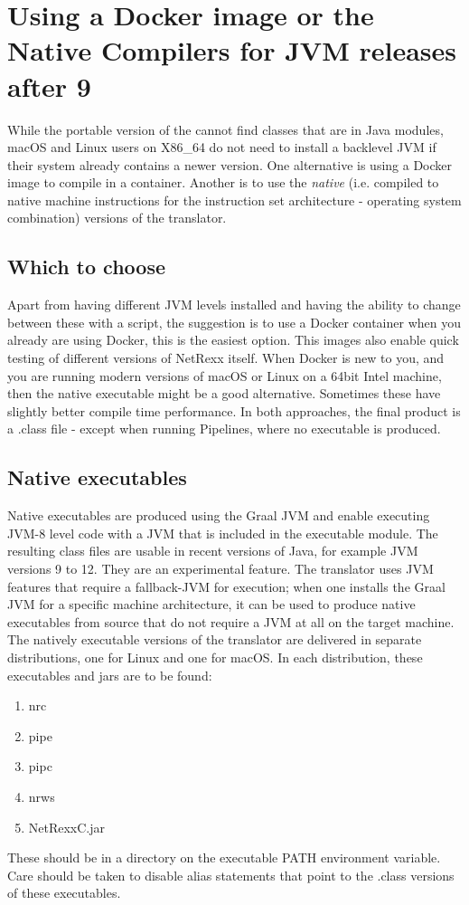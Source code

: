 \chapter{Using a Docker image or the Native Compilers for JVM releases after 9}\label{native compiler}
While the portable version of the \nr{} cannot find classes that are in Java modules, macOS and Linux users on X86\_64 do not need to install a backlevel JVM if their system already contains a newer version. One alternative is using a Docker image to compile in a container. Another is to use the \emph{native} (i.e. compiled to native machine instructions for the instruction set architecture - operating system combination) versions of the translator.
\section{Which to choose}
Apart from having different JVM levels installed and having the ability to change between these with a script, the suggestion is to use a Docker container when you already are using Docker, this is the easiest option. This images also enable quick testing of different versions of NetRexx itself. When Docker is new to you, and you are running modern versions of macOS or Linux on a 64bit Intel machine, then the native executable might be a good alternative. Sometimes these have slightly better compile time performance. In both approaches, the final product is a .class file - except when running \nr{} Pipelines, where no executable is produced.
\section{Native executables}
Native executables are produced using the Graal JVM and enable executing JVM-8 level code with a JVM that is included in the executable module. The resulting class files are usable in recent versions of Java, for example JVM versions 9 to 12. They are an experimental feature. The \nr{} translator uses JVM features that require a fallback-JVM for execution; when one installs the Graal JVM for a specific machine architecture, it can be used to produce native executables from \nr{} source that do not require a JVM at all on the target machine. The natively executable versions of the translator are delivered in separate distributions, one for Linux and one for macOS. In each distribution, these executables and jars are to be found:
\begin{enumerate}
\item nrc
\item pipe
\item pipc
\item nrws
\item NetRexxC.jar
\end{enumerate}
These should be in a directory on the executable PATH environment variable. Care should be taken to disable alias statements that point to the .class versions of these executables.
